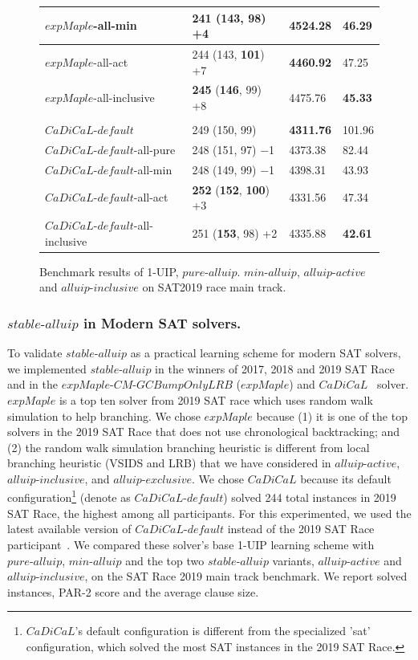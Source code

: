 \documentclass[runningheads]{llncs}
\newcommand{\oneuip}{1-UIP\xspace}
\newcommand{\stablealluip}{\textit{stable-alluip}\xspace}
\newcommand{\allUipPure}{\textit{pure-alluip}\xspace}
\newcommand{\allUipMin}{\textit{min-alluip}\xspace}
\newcommand{\allUipAct}{\textit{alluip-active}}
\newcommand{\allUipIn}{\textit{alluip-inclusive}}
\newcommand{\allUipEx}{\textit{alluip-exclusive}}
\newcommand{\expSAT}{\textit{expMaple-CM-GCBumpOnlyLRB} }
\newcommand{\expSATShort}{\textit{expMaple} }
\newcommand{\cadical}{\textit{CaDiCaL}}
\newcommand{\defaultcadical}{\textit{CaDiCaL-default}}
\begin{document}
\begin{figure}
\begin{center}
\begin{tabular}{|l|l|l|l|}
\hline
$\expSATShort$-all-min & 241 (143, 98) +4 & 4524.28 & 46.29 \\ 
\hline
$\expSATShort$-all-act & 244 (143, \textbf{101}) +7 & \textbf{4460.92} & 47.25 \\
\hline
$\expSATShort$-all-inclusive & \textbf{245} (\textbf{146}, 99) +8 & 4475.76 & \textbf{45.33}
\\
\hline
\hline
 & & &\\
$\defaultcadical$ & 249 (150, 99)  & \textbf{4311.76} & 101.96 \\
\hline
$\defaultcadical$-all-pure & 248 (151, 97) $-$1  & 4373.38 & 82.44  \\
\hline
$\defaultcadical$-all-min & 248 (149, 99) $-$1 & 4398.31 & 43.93 \\ 
\hline
$\defaultcadical$-all-act & \textbf{252} (\textbf{152}, \textbf{100}) +3 & 4331.56 & 47.34 \\
\hline
$\defaultcadical$-all-inclusive & 251 (\textbf{153}, 98) +2 & 4335.88 & \textbf{42.61}
\\
\hline
\end{tabular}
\end{center}
\caption{Benchmark results of \oneuip, $\allUipPure$. $\allUipMin$, $\allUipAct$ and $\allUipIn$ on SAT2019 race main track.}
\label{fig:t5}
\end{figure}


\subsubsection{$\stablealluip$ in Modern SAT solvers.}
\begin{sloppypar}
To validate $\stablealluip$ as a practical learning scheme for modern
SAT solvers, we implemented $\stablealluip$ in the winners of 2017,
2018 and 2019 SAT Race
\cite{DBLP:conf/ijcai/LuoLXML17,ryvchin2018maple,Stepan2019MapleLCMDistChronoBT}
and in the $\expSAT$ \cite{MdSolimul2019expMalpe} ($\expSATShort$)
and $\cadical$~\cite{cadical} solver. $\expSATShort$ is a top ten solver from 2019 SAT race which
uses random walk simulation to help branching. We chose $\expSATShort$
because (1) it is one of the top solvers in the 2019 SAT Race that does
not use chronological backtracking; and (2) the random walk simulation
branching heuristic is different from local branching heuristic (VSIDS
and LRB) that we have considered in $\allUipAct$, $\allUipIn$, and
$\allUipEx$. We chose $\cadical$ because its default configuration\footnote{$\cadical$'s default configuration is different from the specialized 'sat' configuration, which solved the most SAT instances in the 2019 SAT Race.} (denote as $\defaultcadical$) solved 244 total instances in 2019 SAT Race, the highest among all participants. For this experimented, we used the latest available version of $\defaultcadical$ instead of the 2019 SAT Race participant~\cite{Armin2019Cadical}.  We compared these solver's base \oneuip learning scheme
with $\allUipPure$, $\allUipMin$ and the top two $\stablealluip$
variants, $\allUipAct$ and $\allUipIn$, on the SAT Race 2019 main
track benchmark. We report solved instances, PAR-2 score and the
average clause size.
\end{sloppypar}
\end{document}
